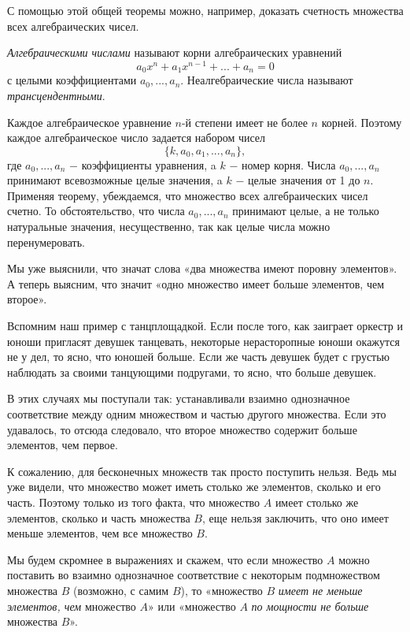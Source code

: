 \documentclass{article}
\begin{document}
С помощью этой общей теоремы можно, например, доказать счетность множества всех алгебраических чисел.

\textit{Алгебраическими числами} называют корни алгебраических уравнений
\[
a_0x^n + a_1x^{n - 1} + ... + a_n = 0
\]
с целыми коэффициентами \(a_0, ..., a_n\). Неалгебраические числа называют \textit{трансцендентными}.

Каждое алгебраическое уравнение \(n\)-й степени имеет не более \(n\) корней. Поэтому каждое алгебраическое число задается набором чисел
\[
\{k, a_0, a_1, ..., a_n\},
\]
где \(a_0, ..., a_n\) \(-\) коэффициенты уравнения, a \(k\) \(-\) номер корня. Числа \(a_0, ..., a_n\) принимают всевозможные целые значения, a \(k\) \(-\) целые значения от 1 до \(n\). Применяя теорему, убеждаемся, что множество всех алгебраических чисел счетно. То обстоятельство, что числа \(a_0, ..., a_n\) принимают целые, а не только натуральные значения, несущественно, так как целые числа можно перенумеровать. \newline

Мы уже выяснили, что значат слова «два множества имеют поровну элементов». А теперь выясним, что значит «одно множество имеет больше элементов, чем второе».

Вспомним наш пример с танцплощадкой. Если после того, как заиграет оркестр и юноши пригласят девушек танцевать, некоторые нерасторопные юноши окажутся не у дел, то ясно, что юношей больше. Если же часть девушек будет с грустью наблюдать за своими танцующими подругами, то ясно, что больше девушек.

В этих случаях мы поступали так: устанавливали взаимно однозначное соответствие между одним множеством и частью другого множества. Если это удавалось, то отсюда следовало, что второе множество содержит больше элементов, чем первое.

К сожалению, для бесконечных множеств так просто поступить нельзя. Ведь мы уже видели, что множество может иметь столько же элементов, сколько и его часть. Поэтому только из того факта, что множество \(A\) имеет столько же элементов, сколько и часть множества \(B\), еще нельзя заключить, что оно имеет меньше элементов, чем все множество \(B\).

Мы будем скромнее в выражениях и скажем, что если множество \(A\) можно поставить во взаимно однозначное соответствие с некоторым подмножеством множества \(B\) (возможно, с самим \(B\)), то «множество \(B\) \textit{имеет не меньше элементов, чем} множество \(A\)» или «множество \(A\) \textit{по мощности не больше} множества \(B\)».
\end{document}
